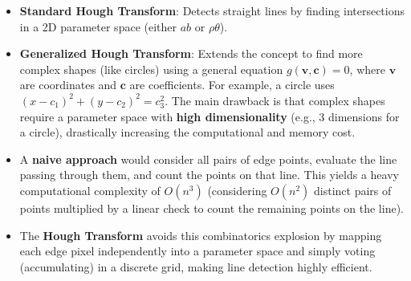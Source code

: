 {\begin{itemize}
    \item \textbf{Standard Hough Transform}: Detects straight lines by finding intersections in a 2D parameter space (either $ab$ or $\rho\theta$).
    \item \textbf{Generalized Hough Transform}: Extends the concept to find more complex shapes (like circles) using a general equation $g(\boldsymbol{v}, \boldsymbol{c}) = 0$, where $\boldsymbol{v}$ are coordinates and $\boldsymbol{c}$ are coefficients. For example, a circle uses $(x - c_1)^2 + (y - c_2)^2 = c_3^2$. The main drawback is that complex shapes require a parameter space with \textbf{high dimensionality} (e.g., 3 dimensions for a circle), drastically increasing the computational and memory cost.
\end{itemize}}

{\begin{itemize}
    \item A \textbf{naive approach} would consider all pairs of edge points, evaluate the line passing through them, and count the points on that line. This yields a heavy computational complexity of $O(n^3)$ (considering $O(n^2)$ distinct pairs of points multiplied by a linear check to count the remaining points on the line).
    \item The \textbf{Hough Transform} avoids this combinatorics explosion by mapping each edge pixel independently into a parameter space and simply voting (accumulating) in a discrete grid, making line detection highly efficient.
\end{itemize}}
